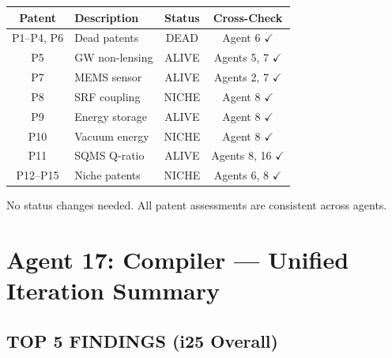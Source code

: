 \documentclass[11pt]{article}
\begin{document}
\begin{center}
\begin{tabular}{clcc}
\toprule
\textbf{Patent} & \textbf{Description} & \textbf{Status} & \textbf{Cross-Check} \\
\midrule
P1--P4, P6 & Dead patents & DEAD & Agent 6 $\checkmark$ \\
P5 & GW non-lensing & ALIVE & Agents 5, 7 $\checkmark$ \\
P7 & MEMS sensor & ALIVE & Agents 2, 7 $\checkmark$ \\
P8 & SRF coupling & NICHE & Agent 8 $\checkmark$ \\
P9 & Energy storage & ALIVE & Agent 8 $\checkmark$ \\
P10 & Vacuum energy & NICHE & Agent 8 $\checkmark$ \\
P11 & SQMS Q-ratio & ALIVE & Agents 8, 16 $\checkmark$ \\
P12--P15 & Niche patents & NICHE & Agents 6, 8 $\checkmark$ \\
\bottomrule
\end{tabular}
\end{center}

No status changes needed. All patent assessments are consistent
across agents.


\section{Agent 17: Compiler --- Unified Iteration Summary}

\subsection{TOP 5 FINDINGS (i25 Overall)}
\end{document}
